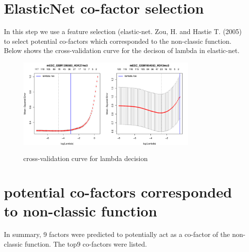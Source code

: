 \documentclass[11pt,a4paper]{article}
\begin{document}
\section{ElasticNet co-factor selection}
In this step we use a feature selection (elastic-net. Zou, H. and Hastie T. (2005) to select potential co-factors which corresponded to the non-classic function. Below shows the cross-validation curve for the decison of lambda in elastic-net.  
\begin{figure}[h]
        \caption{cross-validation curve for lambda decision} \label{fig:profileunion}
        \setlength{\abovecaptionskip}{0pt}
        \setlength{\belowcaptionskip}{10pt}
        \centering
        {\includegraphics[width=0.8\textwidth]{test7_elnet_lambdaSelection.pdf}}
\end{figure}

\newpage
\newpage
\section{potential co-factors corresponded to non-classic function}
In summary, 9 factors were predicted to potentially act as a co-factor of the non-classic function. The top9 co-factors were listed.
\end{document}
